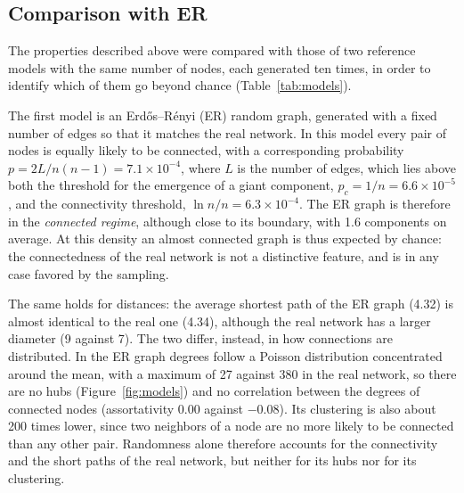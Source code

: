 \documentclass[sigchi]{acmart}
\begin{document}
\subsection{Comparison with ER}
\label{sec:er}
The properties described above were compared with those of two
reference models with the same number of nodes, each generated ten
times, in order to identify which of them go beyond chance
(Table~\ref{tab:models}).

The first model is an Erd\H{o}s--R\'enyi (ER) random graph, generated with a
fixed number of edges so that it matches the real network. In this model
every pair of nodes is equally likely to be connected, with a
corresponding probability $p = 2L/n(n-1) = 7.1 \times 10^{-4}$, where
$L$ is the number of edges, which lies above both the threshold for the emergence of a giant component, $p_c = 1/n = 6.6 \times 10^{-5}$, and the connectivity threshold, $\ln n / n = 6.3 \times 10^{-4}$. The ER graph is therefore in the \emph{connected regime}, although close to its boundary, with 1.6 components on average. At this density an almost connected graph is thus expected by chance: the connectedness of the real network is not a distinctive feature, and is in any case favored by the sampling.

The same holds for distances: the average shortest path of the ER graph
(4.32) is almost identical to the real one (4.34), although the real
network has a larger diameter (9 against 7). The two differ, instead, in how
connections are distributed. In the ER graph degrees follow a Poisson
distribution concentrated around the mean, with a maximum of 27 against
380 in the real network, so there are no hubs (Figure~\ref{fig:models})
and no correlation between the degrees of connected nodes
(assortativity 0.00 against $-0.08$). Its clustering is also about 200
times lower, since two neighbors of a node are no more likely to be
connected than any other pair. Randomness alone therefore accounts for
the connectivity and the short paths of the real network, but neither
for its hubs nor for its clustering.
\end{document}
